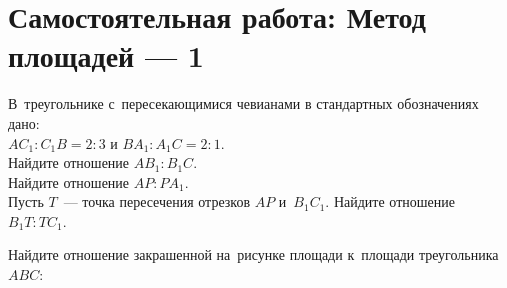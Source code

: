 
\section*{Самостоятельная работа: Метод площадей --- 1}


\begin{problems}

\item
В~треугольнике с~пересекающимися чевианами в стандартных обозначениях дано:\\
$A C_1 : C_1 B = 2 : 3$\enspace
и\enspace
$B A_1 : A_1 C = 2 : 1$.
\\
\subproblem
Найдите отношение $A B_1 : B_1 C$.
\\
\subproblem
Найдите отношение $AP : P A_1$.
\\
\subproblem
Пусть $T$~--- точка пересечения отрезков $AP$ и~$B_1 C_1$.
Найдите отношение $B_1 T : T C_1$.

\item
Найдите отношение закрашенной на~рисунке площади к~площади треугольника $ABC$:
\begin{center}
\end{center}

\end{problems}

